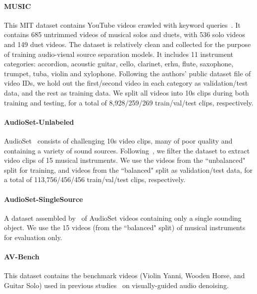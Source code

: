 \documentclass[10pt,twocolumn,letterpaper]{article}
\begin{document}
\paragraph{MUSIC}
This MIT dataset contains YouTube videos crawled with keyword queries~\cite{zhao2018sound}. It contains 685 untrimmed videos of musical solos and duets, with 536 solo videos and 149 duet videos. The dataset is relatively clean and collected for the purpose of training audio-visual source separation models. It includes 11 instrument categories: accordion, acoustic guitar, cello, clarinet, erhu, flute, saxophone, trumpet, tuba, violin and xylophone. Following the authors' public dataset file of video IDs, we hold out the first/second video in each category as validation/test data, and the rest as training data. We split all videos into 10s clips during both training and testing, for a total of 8,928/259/269 train/val/test clips, respectively.
\vspace*{-0.15in}
\paragraph{AudioSet-Unlabeled}
AudioSet~\cite{gemmeke2017audio} consists of challenging 10s video clips, many of poor quality and containing a variety of sound sources. Following~\cite{gao2018objectSounds}, we filter the dataset to extract video clips of 15 musical instruments. We use the videos from the ``unbalanced" split for training, and videos from the ``balanced" split as validation/test data, for a total of 113,756/456/456 train/val/test clips, respectively.
\vspace*{-0.15in}
\paragraph{AudioSet-SingleSource} 
A dataset assembled by~\cite{gao2018objectSounds} of AudioSet videos containing only a single sounding object. We use the 15 videos (from the ``balanced" split) of musical instruments for evaluation only.   
\vspace*{-0.15in}
\paragraph{AV-Bench}
This dataset contains the benchmark videos (Violin Yanni, Wooden Horse, and Guitar Solo) used in previous studies~\cite{gao2018objectSounds,pu2017audio} on visually-guided audio denoising.

\vspace*{0.05in}
\end{document}
